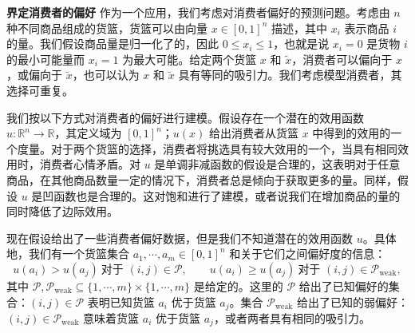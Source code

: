 \documentclass[UTF8, 12pt, fontset=fandol, oneside]{ctexart}
\begin{document}
\noindent\textbf{界定消费者的偏好}\quad
作为一个应用，我们考虑对消费者偏好的预测问题。考虑由 $n$ 种不同商品组成的货篮，货篮可以由向量 $x\in[0,1]^n$ 描述，其中 $x_i$ 表示商品 $i$ 的量。我们假设商品量是归一化了的，因此 $0\leq x_i\leq 1$，也就是说 $x_i=0$ 是货物 $i$ 的最小可能量而 $x_i=1$ 为最大可能。给定两个货篮 $x$ 和 $\tilde{x}$，消费者可以偏向于 $x$，或偏向于 $\tilde{x}$，也可以认为 $x$ 和 $\tilde{x}$ 具有等同的吸引力。我们考虑模型消费者，其选择可重复。

我们按以下方式对消费者的偏好进行建模。假设存在一个潜在的效用函数 $u:\mathbb{R}^n\to\mathbb{R}$，其定义域为 $[0,1]^n$；$u(x)$ 给出消费者从货篮 $x$ 中得到的效用的一个度量。对于两个货篮的选择，消费者将挑选具有较大效用的一个，当具有相同效用时，消费者心情矛盾。对 $u$ 是单调非减函数的假设是合理的，这表明对于任意商品，在其他商品数量一定的情况下，消费者总是倾向于获取更多的量。同样，假设 $u$ 是凹函数也是合理的。这对饱和进行了建模，或者说我们在增加商品的量的同时降低了边际效用。

现在假设给出了一些消费者偏好数据，但是我们不知道潜在的效用函数 $u$。具体地，我们有一个货篮集合 $a_1,\cdots,a_m\in[0,1]^n$ 和关于它们之间偏好度的信息：
\begin{equation}
u(a_i)>u(a_j)\ \text{对于 }(i,j)\in\mathcal{P},\qquad
u(a_i)\geq u(a_j)\ \text{对于 }(i,j)\in\mathcal{P}_{\mathrm{weak}},
\tag{6.22}
\end{equation}
其中 $\mathcal{P},\mathcal{P}_{\mathrm{weak}}\subseteq\{1,\cdots,m\}\times\{1,\cdots,m\}$ 是给定的。这里的 $\mathcal{P}$ 给出了已知偏好的集合：$(i,j)\in\mathcal{P}$ 表明已知货篮 $a_i$ 优于货篮 $a_j$。集合 $\mathcal{P}_{\mathrm{weak}}$ 给出了已知的弱偏好：$(i,j)\in\mathcal{P}_{\mathrm{weak}}$ 意味着货篮 $a_i$ 优于货篮 $a_j$，或者两者具有相同的吸引力。
\end{document}
